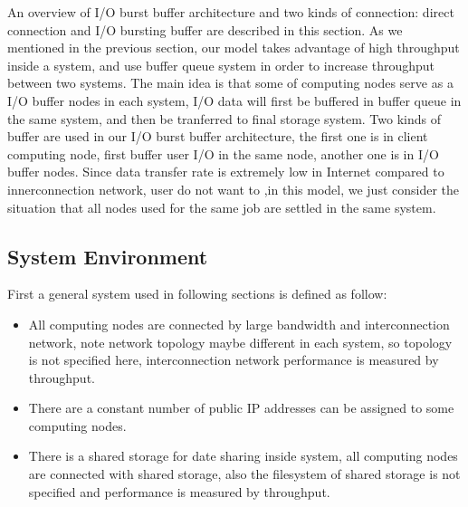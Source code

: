 \documentclass[JIP,draft]{ipsj}
\begin{document}
An overview of I/O burst buffer architecture and two kinds of connection: direct connection and I/O bursting buffer are described in this section.
As we mentioned in the previous section, our model takes advantage of high throughput inside a system, and use buffer queue system in order to increase throughput between two systems.
The main idea is that some of computing nodes serve as a I/O buffer nodes in each system, I/O data will first be buffered in buffer queue in the same system, and then be tranferred to final storage system.
Two kinds of buffer are used in our I/O burst buffer architecture, the first one is in client computing node, first buffer user I/O in the same node, another one is in I/O buffer nodes.
Since data transfer rate is extremely low in Internet compared to innerconnection network, user do not want to ,in this model, we just consider the situation that all nodes used for the same job are settled in the same system.




\subsection{System Environment}
First a general system used in following sections is defined as follow:

\begin{itemize}
	\item All computing nodes are connected by large bandwidth and interconnection network, note network topology maybe different in each system, so topology is not specified here, interconnection network performance is measured by throughput.
	\item There are a constant number of public IP addresses can be assigned to some computing nodes.
	\item There is a shared storage for date sharing inside system, all computing nodes are connected with shared storage, also the filesystem of shared storage is not specified and performance is measured by throughput.
\end{itemize}
\end{document}
